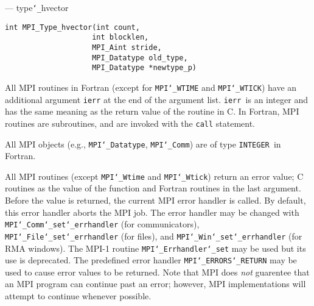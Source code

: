 \startmanpage
{}
--- type{\tt \char`\_}hvector 
\startvb\begin{verbatim}
int MPI_Type_hvector(int count,
                    int blocklen,
                    MPI_Aint stride,
                    MPI_Datatype old_type,
                    MPI_Datatype *newtype_p)

\end{verbatim}
\endvb

\par
{}
\par
{}
All MPI routines in Fortran (except for {\tt MPI{\tt \char`\_}WTIME} and {\tt MPI{\tt \char`\_}WTICK}) have
an additional argument {\tt ierr} at the end of the argument list.  {\tt ierr
}is an integer and has the same meaning as the return value of the routine
in C.  In Fortran, MPI routines are subroutines, and are invoked with the
{\tt call} statement.
\par
All MPI objects (e.g., {\tt MPI{\tt \char`\_}Datatype}, {\tt MPI{\tt \char`\_}Comm}) are of type {\tt INTEGER
}in Fortran.
\par
{}
\par
All MPI routines (except {\tt MPI{\tt \char`\_}Wtime} and {\tt MPI{\tt \char`\_}Wtick}) return an error value;
C routines as the value of the function and Fortran routines in the last
argument.  Before the value is returned, the current MPI error handler is
called.  By default, this error handler aborts the MPI job.  The error handler
may be changed with {\tt MPI{\tt \char`\_}Comm{\tt \char`\_}set{\tt \char`\_}errhandler} (for communicators),
{\tt MPI{\tt \char`\_}File{\tt \char`\_}set{\tt \char`\_}errhandler} (for files), and {\tt MPI{\tt \char`\_}Win{\tt \char`\_}set{\tt \char`\_}errhandler} (for
RMA windows).  The MPI-1 routine {\tt MPI{\tt \char`\_}Errhandler{\tt \char`\_}set} may be used but
its use is deprecated.  The predefined error handler
{\tt MPI{\tt \char`\_}ERRORS{\tt \char`\_}RETURN} may be used to cause error values to be returned.
Note that MPI does {\em not} guarentee that an MPI program can continue past
an error; however, MPI implementations will attempt to continue whenever
possible.
\par
{}
\endmanpage
